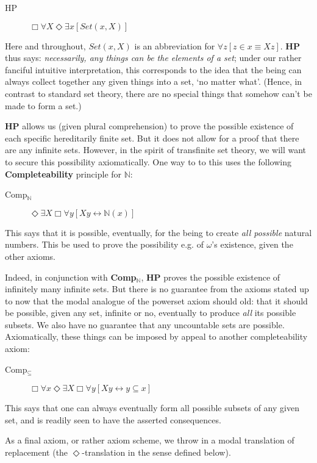 \documentclass{article}
\begin{document}
\begin{description} 
    \item[HP] $\Box \forall X \Diamond \exists x [Set(x, X)]$
\end{description}
Here and throughout, $Set(x, X)$ is an abbreviation for 
$\forall z[z \in x \equiv Xz]$. {\bf HP} thus says: \emph{necessarily, any 
things can be the elements of a set}; under our rather fanciful 
intuitive interpretation, this corresponds to the idea that the being 
can always collect together any given things into a set, `no matter what'.  
(Hence, in contrast to standard set theory, there are no 
special things that somehow can't be made to form a set.)

{\bf HP} allows us (given plural comprehension) to prove the possible existence 
of each specific hereditarily finite set. But it does not allow for a proof that 
there are any infinite sets. However, in the spirit of transfinite 
set theory, we will want to secure this possibility axiomatically. 
One way to to this uses the following {\bf Completeability} principle for $\mathbb{N}$:
\begin{description}
    \item[Comp$_\mathbb{N}$]
    $\Diamond \exists X \Box \forall y[ Xy \leftrightarrow \mathbb{N}(x)]$
\end{description}
This says that it is possible, eventually, for the being to create \emph{all possible}
natural numbers. This be used to prove the possibility 
e.g. of $\omega$'s existence, given the other axioms.

Indeed, in conjunction with {\bf Comp$_\mathbb{N}$}, 
{\bf HP} proves the possible existence of infinitely many
infinite sets. But there is no guarantee from the axioms stated up to now that 
the modal analogue of the powerset axiom should old: that it should be possible, 
given any set, infinite or no, eventually to produce \emph{all} its possible subsets. 
We also have no guarantee that any uncountable sets are possible.
Axiomatically, these things can be imposed by appeal to another completeability axiom:
\begin{description}
    \item[Comp$_\subseteq$]
    $\Box \forall x \Diamond \exists X \Box \forall y[ Xy \leftrightarrow y \subseteq x]$
\end{description}
This says that one can always eventually form all possible subsets of any given set, 
and is readily seen to have the asserted consequences.

As a final axiom, or rather axiom scheme, we throw in a modal 
translation of replacement (the $\Diamond$-translation in the sense defined below).
\end{document}
